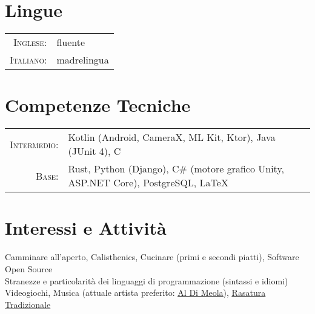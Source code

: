 \documentclass[a4paper,10pt]{article} %
\begin{document}

\section{Lingue}

\begin{tabular}{rl}
\textsc{Inglese:} & fluente\\
\textsc{Italiano:} & madrelingua\\
\end{tabular}


\section{Competenze Tecniche}

\begin{tabular}{rl}
\textsc{Intermedio:} & Kotlin \footnotesize(Android, CameraX, ML Kit, Ktor)\normalsize, Java \footnotesize(JUnit 4)\normalsize, C\\
\textsc{Base:} & Rust, Python \footnotesize(Django)\normalsize, C\# \footnotesize(motore grafico Unity, ASP.NET Core)\normalsize, PostgreSQL, {\sffamily\LaTeX}\setmainfont[SmallCapsFont=Fontin SmallCaps]{Fontin-Regular}\\

\end{tabular}


\section{Interessi e Attività}

Camminare all'aperto, Calisthenics, Cucinare \footnotesize(primi e secondi piatti)\normalsize, Software Open Source\\
Stranezze e particolarità dei linguaggi di programmazione \footnotesize(sintassi e idiomi)\normalsize\\
Videogiochi, Musica \footnotesize(attuale artista preferito: \href{https://youtu.be/tsmThCBkBUo}{\underline{Al Di Meola}})\normalsize, \href{https://youtu.be/s0lyDViRbTY}{\underline{Rasatura Tradizionale}}

\end{document}
